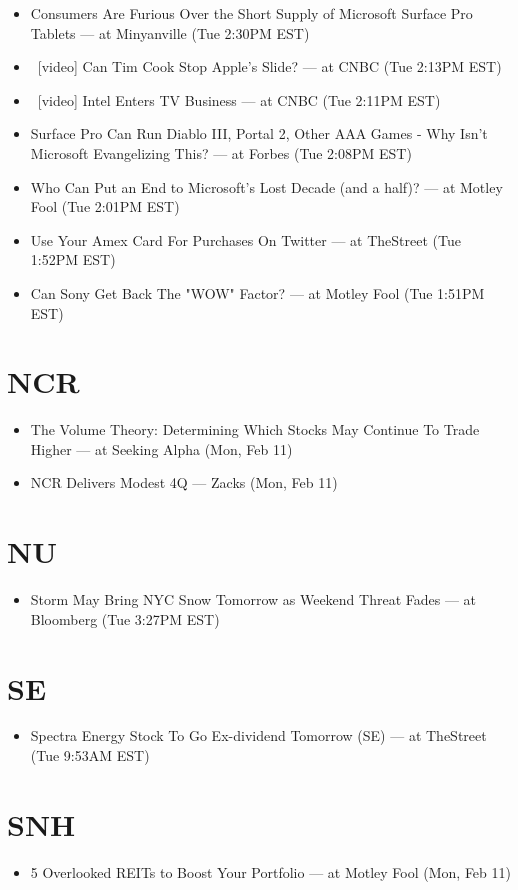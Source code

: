\documentclass[11pt,asymmetric]{article}
\begin{document}
\begin{itemize}
\item Consumers Are Furious Over the Short Supply of Microsoft Surface Pro Tablets --- at Minyanville (Tue 2:30PM EST)
\item\ [video] Can Tim Cook Stop Apple's Slide? --- at CNBC (Tue 2:13PM EST)
\item\ [video] Intel Enters TV Business --- at CNBC (Tue 2:11PM EST)
\item Surface Pro Can Run Diablo III, Portal 2, Other AAA Games - Why Isn't Microsoft Evangelizing This? --- at Forbes (Tue 2:08PM EST)
\item Who Can Put an End to Microsoft's Lost Decade (and a half)? --- at Motley Fool (Tue 2:01PM EST)
\item Use Your Amex Card For Purchases On Twitter --- at TheStreet (Tue 1:52PM EST)
\item Can Sony Get Back The "WOW" Factor? --- at Motley Fool (Tue 1:51PM EST)
\end{itemize}

\section*{NCR}
\begin{itemize}
\item The Volume Theory: Determining Which Stocks May Continue To Trade Higher --- at Seeking Alpha (Mon, Feb 11)
\item NCR Delivers Modest 4Q --- Zacks (Mon, Feb 11)
\end{itemize}

\section*{NU}
\begin{itemize}
\item Storm May Bring NYC Snow Tomorrow as Weekend Threat Fades --- at Bloomberg (Tue 3:27PM EST)
\end{itemize}

\section*{SE}
\begin{itemize}
\item Spectra Energy Stock To Go Ex-dividend Tomorrow (SE) --- at TheStreet (Tue 9:53AM EST)
\end{itemize}

\section*{SNH}
\begin{itemize}
\item 5 Overlooked REITs to Boost Your Portfolio --- at Motley Fool (Mon, Feb 11)
\end{itemize}
\end{document}
